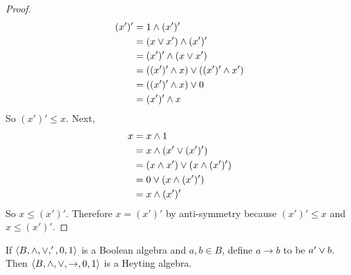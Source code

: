 \begin{proof}
\begin{align*}
  (x')' &= 1 \wedge (x')' \\
        &= (x \vee x') \wedge (x')'  \\
        &= (x')' \wedge (x \vee x') \\
        &= ((x')' \wedge x) \vee ((x')' \wedge x') \\
        &= ((x')' \wedge x) \vee 0 \\
        &= (x')' \wedge x
\end{align*}
So $(x')' \leq x$.
Next,
\begin{align*}
  x &= x \wedge 1 \\
    &= x \wedge (x' \vee (x')') \\
    &= (x \wedge x') \vee (x \wedge (x')') \\
    &= 0 \vee (x \wedge (x')') \\
    &= x \wedge (x')' \\
\end{align*}
So $x \leq (x')'$.
Therefore $x = (x')'$ by anti-symmetry because $(x')' \leq x$ and $x \leq (x')'$.
\end{proof}

\begin{theorem*}
If $\langle B, \wedge, \vee, ', 0 , 1\rangle$ is a Boolean algebra and $a, b \in B$, define $a\to b$ to be $a'\vee b$.
Then $\langle B, \wedge, \vee, \to, 0, 1\rangle$ is a Heyting algebra.
\end{theorem*}

